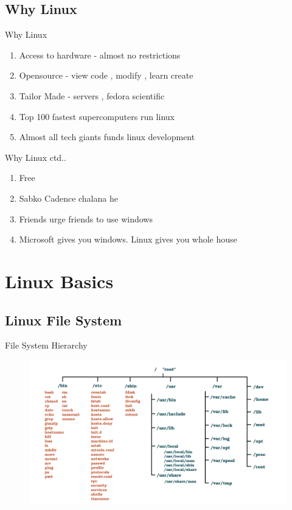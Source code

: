 \documentclass{beamer}
\begin{document}
\subsection{Why Linux}
\begin{frame}{Why Linux}
\begin{enumerate}
	\item<2-> Access to hardware - almost no restrictions
	\item<3-> Opensource - view code , modify , learn create
	\item<4-> Tailor Made - servers , fedora scientific
	\item<5-> Top 100 fastest supercomputers run linux 
	\item<6-> Almost all tech giants funds linux development
\end{enumerate}
\end{frame}
\begin{frame}{Why Linux ctd..}
\begin{enumerate}
	\item<2-> Free
	\item<3-> Sabko Cadence chalana he
	\item<4-> Friends urge friends to use windows 
	\item<5-> Microsoft gives you windows. Linux gives you whole house
\end{enumerate} 
\end{frame}
\section{Linux Basics}
\subsection{Linux File System}
{

	\begin{frame}{File System Hierarchy}
		\begin{figure}
			\includegraphics[width=0.9\paperwidth,height=0.8\paperheight]{./filesystem.pdf}
		\end{figure}
	\end{frame}
}
\end{document}
